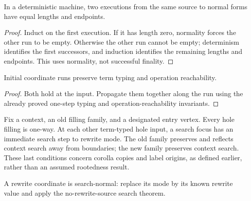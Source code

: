 \begin{lemma}
In a deterministic machine, two executions from the same source to normal
forms have equal lengths and endpoints.
\end{lemma}
\begin{proof}
Induct on the first execution. If it has length zero, normality forces the
other run to be empty. Otherwise the other run cannot be empty; determinism
identifies the first successors, and induction identifies the remaining
lengths and endpoints. This uses normality, not successful finality.
\end{proof}
\begin{lemma}
Initial coordinate runs preserve term typing and operation reachability.
\end{lemma}
\begin{proof}
Both hold at the input. Propagate them together along the run using the already
proved one-step typing and operation-reachability invariants.
\end{proof}




\begin{definition}
Fix a context, an old filling family, and a designated entry vertex. Every
hole filling is one-way. At each other term-typed hole input, a search focus
has an immediate search step to rewrite mode. The old family preserves and
reflects context search away from boundaries; the new family preserves context
search. These last conditions concern corolla copies and label origins, as
defined earlier, rather than an assumed rootedness result.
\end{definition}
A rewrite coordinate is search-normal: replace its mode by its known rewrite
value and apply the no-rewrite-source search theorem.



